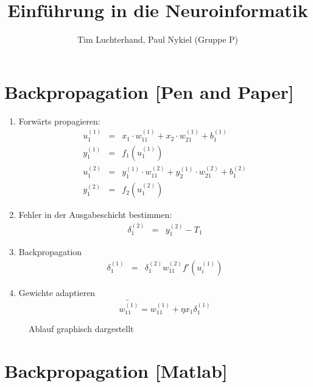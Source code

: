 \documentclass[DIN, pagenumber=false, fontsize=11pt, parskip=half]{scrartcl}
\title{Einführung in die Neuroinformatik}
\author{Tim Luchterhand, Paul Nykiel (Gruppe P)}
\begin{document}
    \maketitle
    \section{Backpropagation [Pen and Paper]}
    \begin{enumerate}
        \item Forwärts propagieren:
            \begin{eqnarray*}
                u_1^{(1)} &=& x_1 \cdot w_{11}^{(1)} + x_2 \cdot w_{21}^{(1)} + b_1^{(1)}\\
                y_1^{(1)} &=& f_1(u_1^{(1)}) \\
                u_1^{(2)} &=& y_1^{(1)} \cdot w_{11}^{(2)} + y_2^{(1)} \cdot w_{21}^{(2)} + b_1^{(2)}\\
                y_1^{(2)} &=& f_2(u_1^{(2)}) 
            \end{eqnarray*}
        \item Fehler in der Ausgabeschicht bestimmen:
            \begin{eqnarray*}
                \delta_1^{(2)} &=& y_1^{(2)} - T_1
            \end{eqnarray*}
        \item Backpropagation
            \begin{eqnarray*}
                \delta_1^{(1)} &=& \delta_1^{(2)} w_{11}^{(2)}f'\left(u_i^{(1)}\right)
            \end{eqnarray*}
        \item Gewichte adaptieren
            \begin{equation*}
                \tilde{w_{11}^{(1)}} =  w_{11}^{(1)} + \eta x_1 \delta_1^{(1)}
            \end{equation*}
    \end{enumerate}
    
	\begin{figure}[H]
		\centering
		
		\caption{Ablauf graphisch dargestellt}
	\end{figure} 

    \section{Backpropagation [Matlab]}
    \subsection{}
    
\end{document}

